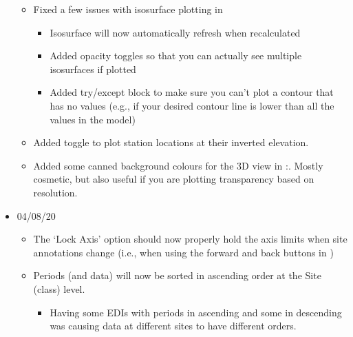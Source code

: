 \documentclass[letterpaper,10pt,english]{sphinxmanual}
\begin{document}
\begin{itemize}
\begin{itemize}
\item {} 
Fixed a few issues with isosurface plotting in {\hyperref[\detokenize{content/model_viewer/main_window:model-viewer}]{}}
\begin{itemize}
\item {} 
Isosurface will now automatically refresh when recalculated

\item {} 
Added opacity toggles so that you can actually see multiple isosurfaces if plotted

\item {} 
Added try/except block to make sure you can’t plot a contour that has no values (e.g., if your desired contour line is lower than all the values in the model)

\end{itemize}

\item {} 
Added toggle to plot station locations at their inverted elevation.

\item {} 
Added some canned background colours for the 3D view in {\hyperref[\detokenize{content/model_viewer/main_window:model-viewer}]{}}:. Mostly cosmetic, but also useful if you are plotting transparency based on resolution.

\end{itemize}

\item {} 
04/08/20
\begin{itemize}
\item {} 
The {\hyperref[\detokenize{content/data_plot/map_viewer:map-viewer}]{}} ‘Lock Axis’ option should now properly hold the axis limits when site annotations change (i.e., when using the forward and back buttons in {\hyperref[\detokenize{content/data_plot/main_window:data-plot}]{}})

\item {} 
Periods (and data) will now be sorted in ascending order at the Site (class) level.
\begin{itemize}
\item {} 
Having some EDIs with periods in ascending and some in descending was causing data at different sites to have different orders.


\end{itemize}
\end{itemize}
\end{itemize}
\end{document}
